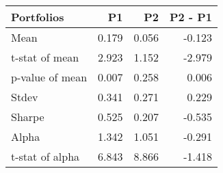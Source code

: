 \begin{tabular}{lrrr}
\toprule
Portfolios & P1 & P2 & P2 - P1 \\
\midrule
Mean & 0.179 & 0.056 & -0.123 \\
t-stat of mean & 2.923 & 1.152 & -2.979 \\
p-value of mean & 0.007 & 0.258 & 0.006 \\
Stdev & 0.341 & 0.271 & 0.229 \\
Sharpe & 0.525 & 0.207 & -0.535 \\
Alpha & 1.342 & 1.051 & -0.291 \\
t-stat of alpha & 6.843 & 8.866 & -1.418 \\
\bottomrule
\end{tabular}

